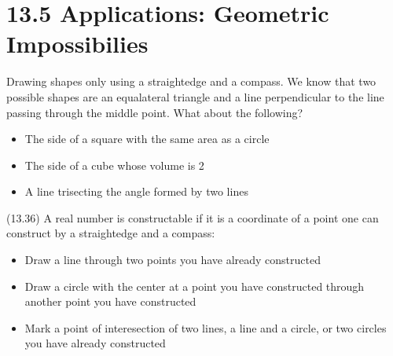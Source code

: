 \section{13.5 Applications: Geometric Impossibilies}
\begin{rmk}
Drawing shapes only using a straightedge and a compass. We know that two possible shapes are an equalateral triangle and a line perpendicular to the line passing through the middle point. What about the following?
\begin{itemize}
\item[(i)] The side of a square with the same area as a circle
\item[(ii)] The side of a cube whose volume is 2
\item[(iii)] A line trisecting the angle formed by two lines
\end{itemize}
\end{rmk}
\vspace{2ex}
\begin{defi}
(13.36) A real number is constructable if it is a coordinate of a point one can construct by a straightedge and a compass:
\begin{itemize}
\item[(i)] Draw a line through two points you have already constructed
\item[(ii)] Draw a circle with the center at a point you have constructed through another point you have constructed 
\item[(iii)] Mark a point of interesection of two lines, a line and a circle, or two circles you have already constructed 
\end{itemize}
\end{defi}
\vspace{2ex}

